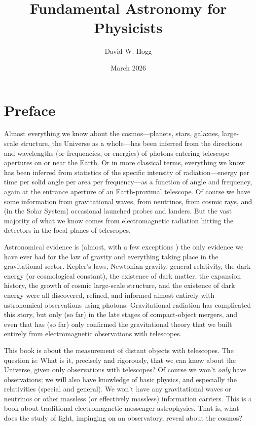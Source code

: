 \documentclass{book}
\title{\bfseries Fundamental Astronomy for Physicists}
\author{David W. Hogg}
\date{March 2026}
\begin{document}
\maketitle
\frontmatter
\chapter{Preface}
Almost everything we know about the cosmos---planets, stars, galaxies, large-scale structure, the Universe as a whole---has been inferred from the directions and wavelengths (or frequencies, or energies) of photons entering telescope apertures on or near the Earth.
Or in more classical terms, everything we know has been inferred from statistics of the specific intensity of radiation---energy per time per solid angle per area per frequency---as a function of angle and frequency, again at the entrance aperture of an Earth-proximal telescope.
Of course we have some information from gravitational waves, from neutrinos, from cosmic rays, and (in the Solar System) occasional launched probes and landers.
But the vast majority of what we know comes from electromagnetic radiation hitting the detectors in the focal planes of telescopes.

Astronomical evidence is (almost, with a few exceptions \cite{labgravity}) the only evidence we have ever had for the law of gravity and everything taking place in the gravitational sector.
Kepler's laws, Newtonian gravity, general relativity, the dark energy (or cosmological constant), the existence of dark matter, the expansion history, the growth of cosmic large-scale structure, and the existence of dark energy were all discovered, refined, and informed almost entirely with astronomical observations using photons.
Gravitational radiation has complicated this story, but only (so far) in the late stages of compact-object mergers, and even that has (so far) only confirmed the gravitational theory that we built entirely from electromagnetic observations with telescopes.

This book is about the measurement of distant objects with telescopes.
The question is:
What is it, precisely and rigorously, that we can know about the Universe, given only observations with telescopes?
Of course we won't \emph{only} have observations;
we will also have knowledge of basic physics, and especially the relativities (special and general).
We won't have any gravitational waves or neutrinos or other massless (or effectively massless) information carriers.
This is a book about traditional electromagnetic-messenger astrophysics.
That is, what does the study of light, impinging on an observatory, reveal about the cosmos?
\end{document}

